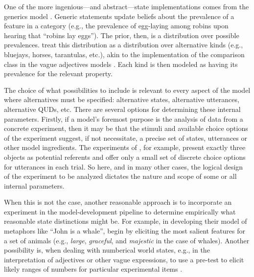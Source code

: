 \documentclass{sp}
\begin{document}
One of the more ingenious---and abstract---state implementations comes from the generics model \citep{tesslergoodman2019}. Generic statements update beliefs about the prevalence of a feature in a category (e.g., the prevalence of egg-laying among robins upon hearing that ``robins lay eggs''). The prior, then, is a distribution over possible prevalences. \citeauthor{tesslergoodman2019} treat this distribution as a distribution over alternative kinds (e.g., bluejays, horses, tarantulas, etc.), akin to the implementation of the comparison class in the vague adjectives models \citep{lassitergoodman2013, tessler2017comparisonclass}. Each kind is then modeled as having its prevalence for the relevant property.

The choice of what possibilities to include is relevant to every aspect of the model where alternatives must be specified: alternative states, alternative utterances, alternative QUDs, etc.
There are several options for determining these internal parameters.
Firstly, if a model's foremost purpose is the analysis of data from a concrete experiment, then it may be that the stimuli and available choice options of the experiment suggest, if not necessitate, a precise set of states, utterances or other model ingredients.
The experiments of \citet{frankgoodman2012}, for example, present exactly three objects as potential referents and offer only a small set of discrete choice options for utterances in each trial.
So here, and in many other cases, the logical design of the experiment to be analyzed dictates the nature and scope of some or all internal parameters.

When this is not the case, another reasonable approach is to incorporate an experiment in the model-development pipeline to determine empirically what reasonable state distinctions might be. For example, in developing their model of metaphors like ``John is a whale'', \cite{kaoetal2014metaphor} begin by eliciting the most salient features for a set of animals (e.g., \emph{large}, \emph{graceful}, and \emph{majestic} in the case of whales).
Another possibility is, when dealing with numberical world states, e.g., in the interpretation of adjectives or other vague expressions, to use a pre-test to elicit likely ranges of numbers for particular experimental items \citep[e.g.][]{FrankeScholler2016:Semantic-values}.
\end{document}

